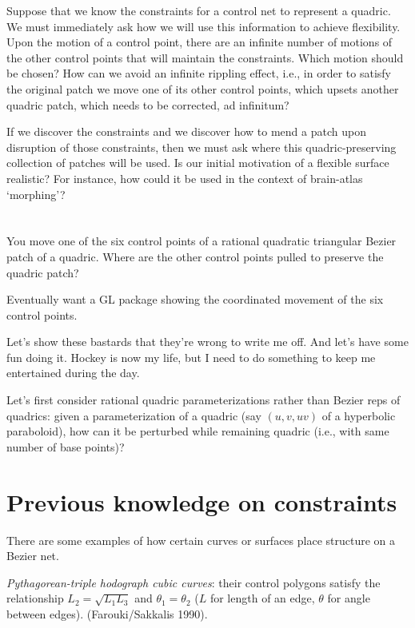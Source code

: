 Suppose that we know the constraints for a control net to represent a quadric.
We must immediately ask how we will use this information to achieve flexibility.
Upon the motion of a control point, there are an infinite number of motions
of the other control points that will maintain the constraints.
Which motion should be chosen?
How can we avoid an infinite rippling effect, i.e., 
in order to satisfy the original patch we move one of its other control points,
which upsets another quadric patch, which needs to be corrected, ad infinitum?

If we discover the constraints and we discover how to mend a patch
upon disruption of those constraints, then we must ask where this
quadric-preserving collection of patches will be used.
Is our initial motivation of a flexible surface realistic?
For instance, how could it be used in the context of brain-atlas `morphing'?


\section{}

You move one of the six control points of a rational quadratic
triangular Bezier patch of a quadric.
Where are the other control points pulled 
to preserve the quadric patch?

Eventually want a GL package showing the coordinated movement of
the six control points.

Let's show these bastards that they're wrong to write me off.
And let's have some fun doing it. Hockey is now my life, but I need
to do something to keep me entertained during the day.

Let's first consider rational quadric
parameterizations rather than Bezier reps of quadrics:
given a parameterization of a quadric (say $(u,v,uv)$ of a hyperbolic
paraboloid), how can it be perturbed while remaining quadric
(i.e., with same number of base points)?

\section{Previous knowledge on constraints}

There are some examples of how certain curves or surfaces
place structure on a Bezier net.

{\em Pythagorean-triple hodograph cubic curves}:
	their control polygons satisfy the relationship
	$L_2 = \sqrt{L_1L_3}$ and $\theta_1 = \theta_2$ 
	($L$ for length of an edge, $\theta$ for angle between edges).
	(Farouki/Sakkalis 1990).

